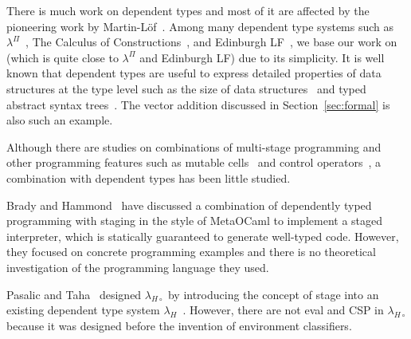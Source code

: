 
There is much work on dependent types and most of it are affected by
the pioneering work by Martin-L\"{o}f~\cite{martin1973intuitionistic}.
Among many dependent type systems such as
$\lambda^\Pi$~\cite{Meyer1986}, The Calculus of
Constructions~\cite{coquand:inria-00076024}, and Edinburgh
LF~\cite{harper1993framework}, we base our work on \LLF~\cite{attapl}
(which is quite close to $\lambda^\Pi$ and Edinburgh LF) due to its
simplicity.  It is well known that dependent types are useful to
express detailed properties of data structures at the type level such
as the size of data structures~\cite{Xi98} and typed abstract syntax
trees~\cite{DBLP:conf/dsl/LeijenM99,DBLP:conf/popl/XiCC03}.  The
vector addition discussed in Section~\ref{sec:formal} is also such an
example.




Although there are studies on combinations of multi-stage programming and
other programming features such as mutable cells~\cite{kiselyov2016refined} and
control operators~\cite{KameyamaKiselyovShan09PEPM,oishi2017staging}, a
combination with dependent types has been little studied. 

Brady and Hammond~\cite{brady2006dependently} have discussed a
combination of dependently typed programming with staging in the style of
MetaOCaml to implement a staged interpreter, which is statically guaranteed
to generate well-typed code. However, they focused on concrete programming
examples and there is no theoretical investigation of the programming
language they used. 

Pasalic and Taha~\cite{pasalic2002tagless} designed \(\lambda_{H\circ}\) by
introducing the concept of stage into an existing dependent type system
\(\lambda_H\)~\cite{zhong2002certified}. However, there are not eval and CSP
in \(\lambda_{H\circ}\) because it was designed before the invention of
environment classifiers.

